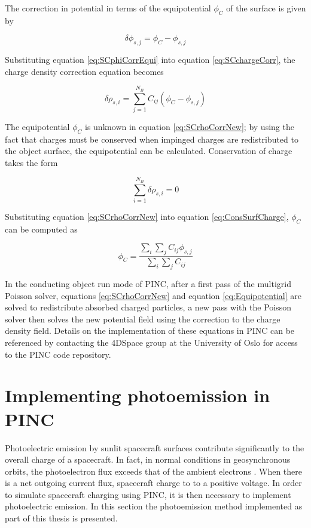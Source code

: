 The correction in potential in terms of the equipotential $\phi_C$ of the surface is given by

\begin{equation}\label{eq:SCphiCorrEqui}
    \delta \phi_{s,j} = \phi_C - \phi_{s,j}
\end{equation}

Substituting equation \ref{eq:SCphiCorrEqui} into equation \ref{eq:SCchargeCorr}, the charge density correction equation becomes

\begin{equation}\label{eq:SCrhoCorrNew}
    \delta \rho_{s,i} = \sum^{N_B}_{j=1} C_{ij} (\phi_C - \phi_{s,j})
\end{equation}

The equipotential $\phi_C$ is unknown in equation \ref{eq:SCrhoCorrNew}; by using the fact that charges must be conserved when impinged charges are redistributed to the object surface, the equipotential can be calculated. Conservation of charge takes the form

\begin{equation}\label{eq:ConsSurfCharge}
    \sum^{N_B}_{i=1} \delta \rho_{s,i} = 0
\end{equation}

Substituting equation \ref{eq:SCrhoCorrNew} into equation \ref{eq:ConsSurfCharge}, $\phi_C$ can be computed as

\begin{equation}\label{eq:Equipotential}
    \phi_C = \frac{\sum_i \sum_j C_{ij} \phi_{s,j}}{\sum_i \sum_j C_{ij}}
\end{equation}

In the conducting object run mode of PINC, after a first pass of the multigrid Poisson solver, equations \ref{eq:SCrhoCorrNew} and equation \ref{eq:Equipotential} are solved to redistribute absorbed charged particles, a new pass with the Poisson solver then solves the new potential field using the correction to the charge density field. Details on the implementation of these equations in PINC can be referenced by contacting the 4DSpace group at the University of Oslo for access to the PINC code repository.

\newpage

\section{Implementing photoemission in PINC}

Photoelectric emission by sunlit spacecraft surfaces contribute significantly to the overall charge of a spacecraft. In fact, in normal conditions in geosynchronous orbits, the photoelectron flux exceeds that of the ambient electrons . When there is a net outgoing current flux, spacecraft charge to to a positive voltage. In order to simulate spacecraft charging using PINC, it is then necessary to implement photoelectric emission. In this section the photoemission method implemented as part of this thesis is presented. 


